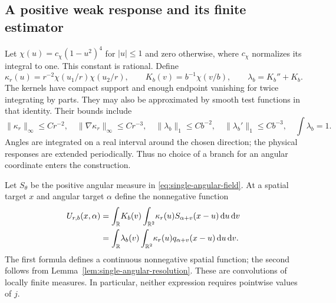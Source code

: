 \subsection{A positive weak response and its finite estimator}
Let $\chi(u)=c_\chi(1-u^2)^4$ for $|u|\le1$ and zero otherwise,
where $c_\chi$ normalizes its integral to one.  This constant is
rational.  Define
\begin{equation}\label{eq:single-positive-kernels}
 \kappa_r(u)=r^{-2}\chi(u_1/r)\chi(u_2/r),\qquad
 K_b(v)=b^{-1}\chi(v/b),\qquad \lambda_b=K_b''+K_b.
\end{equation}
The kernels have compact support and enough endpoint vanishing for
twice integrating by parts.  They may also be approximated by smooth
test functions in that identity.  Their bounds include
\begin{equation}\label{eq:single-kernel-bounds}
 \|\kappa_r\|_\infty\le Cr^{-2},\quad
 \|\nabla\kappa_r\|_\infty\le Cr^{-3},\quad
 \|\lambda_b\|_1\le Cb^{-2},\quad
 \|\lambda_b'\|_1\le Cb^{-3},\quad
 \int\lambda_b=1.
\end{equation}
Angles are integrated on a real interval around the chosen direction;
the physical responses are extended periodically.  Thus no choice of
a branch for an angular coordinate enters the construction.

Let $S_\theta$ be the positive angular measure in
\eqref{eq:single-angular-field}.  At a spatial target $x$ and angular
target $\alpha$ define the nonnegative function
\begin{align}
 U_{r,b}(x,\alpha)
  &=\int_{\mathbb R}\!K_b(v)\int_{\mathbb R^2}\!\kappa_r(u)
                      S_{\alpha+v}(x-u)\,\mathrm d u\,\mathrm d v
                       \label{eq:single-positive-response}\\
  &=\int_{\mathbb R}\!\lambda_b(v)\int_{\mathbb R^2}\!\kappa_r(u)
                      q_{\alpha+v}(x-u)\,\mathrm d u\,\mathrm d v.
                       \label{eq:single-weak-response}
\end{align}
The first formula defines a continuous nonnegative spatial function;
the second follows from Lemma~\ref{lem:single-angular-resolution}.
These are convolutions of locally finite measures.  In particular,
neither expression requires pointwise values of $j$.

